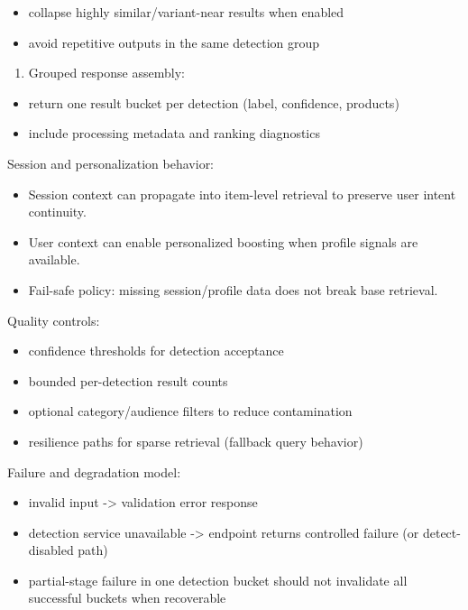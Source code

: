 \documentclass[12pt,a4paper]{report}
\begin{document}
\begin{itemize}
\item collapse highly similar/variant-near results when enabled
\item avoid repetitive outputs in the same detection group
\end{itemize}
\begin{enumerate}
\item Grouped response assembly:
\end{enumerate}
\begin{itemize}
\item return one result bucket per detection (label, confidence, products)
\item include processing metadata and ranking diagnostics
\end{itemize}

Session and personalization behavior:

\begin{itemize}
\item Session context can propagate into item-level retrieval to preserve user intent continuity.
\item User context can enable personalized boosting when profile signals are available.
\item Fail-safe policy: missing session/profile data does not break base retrieval.
\end{itemize}

Quality controls:

\begin{itemize}
\item confidence thresholds for detection acceptance
\item bounded per-detection result counts
\item optional category/audience filters to reduce contamination
\item resilience paths for sparse retrieval (fallback query behavior)
\end{itemize}

Failure and degradation model:

\begin{itemize}
\item invalid input -> validation error response
\item detection service unavailable -> endpoint returns controlled failure (or detect-disabled path)
\item partial-stage failure in one detection bucket should not invalidate all successful buckets when recoverable
\end{itemize}
\end{document}
